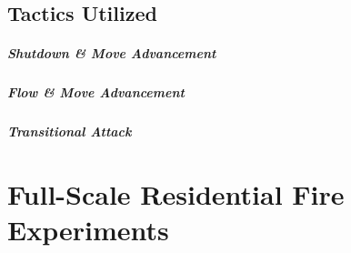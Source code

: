 \documentclass[12pt,oneside]{book}
\begin{document}
\clearpage

\section{Tactics Utilized}


\paragraph{Shutdown \& Move Advancement}



\paragraph{Flow \& Move Advancement}



\paragraph{Transitional Attack}



\chapter{Full-Scale Residential Fire Experiments}
\end{document}

